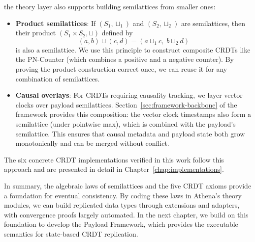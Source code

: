the theory layer also supports building semilattices from smaller ones:
\begin{itemize}
  \item \textbf{Product semilattices}: If $(S_1, \sqcup_1)$ and $(S_2, \sqcup_2)$ are semilattices, then their product $(S_1 \times S_2, \sqcup)$ defined by 
  \[
    (a,b) \sqcup (c,d) = (a \sqcup_1 c,\; b \sqcup_2 d)
  \] 
  is also a semilattice. We use this principle to construct composite CRDTs like the PN-Counter (which combines a positive and a negative counter). By proving the product construction correct once, we can reuse it for any combination of semilattices.
  \item \textbf{Causal overlays}: For CRDTs requiring causality tracking, we layer vector clocks over payload semilattices. Section~\ref{sec:framework-backbone} of the framework provides this composition: the vector clock timestamps also form a semilattice (under pointwise max), which is combined with the payload's semilattice. This ensures that causal metadata and payload state both grow monotonically and can be merged without conflict.
\end{itemize}


The six concrete CRDT implementations verified in this work follow this approach and are presented in detail in Chapter~\ref{chap:implementations}.

\bigskip

In summary, the algebraic laws of semilattices and the five CRDT axioms provide a  foundation for eventual consistency. By coding these laws in Athena’s theory modules, we can build replicated data types through extensions and adapters, with convergence proofs largely automated. In the next chapter, we build on this foundation to develop the Payload Framework, which provides the executable semantics for state-based CRDT replication.

\endinput
